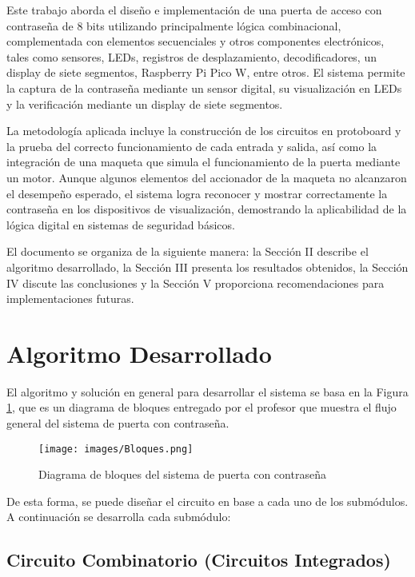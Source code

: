 \documentclass[conference]{IEEEtran}  %
\begin{document}
Este trabajo aborda el diseño e implementación de una puerta de acceso con contraseña de 8 bits utilizando principalmente lógica combinacional, complementada con elementos secuenciales y otros componentes electrónicos, tales como sensores, LEDs, registros de desplazamiento, decodificadores, un display de siete segmentos, Raspberry Pi Pico W, entre otros. El sistema permite la captura de la contraseña mediante un sensor digital, su visualización en LEDs y la verificación mediante un display de siete segmentos.

La metodología aplicada incluye la construcción de los circuitos en protoboard y la prueba del correcto funcionamiento de cada entrada y salida, así como la integración de una maqueta que simula el funcionamiento de la puerta mediante un motor. Aunque algunos elementos del accionador de la maqueta no alcanzaron el desempeño esperado, el sistema logra reconocer y mostrar correctamente la contraseña en los dispositivos de visualización, demostrando la aplicabilidad de la lógica digital en sistemas de seguridad básicos.

El documento se organiza de la siguiente manera: la Sección II describe el algoritmo desarrollado, la Sección III presenta los resultados obtenidos, la Sección IV discute las conclusiones y la Sección V proporciona recomendaciones para implementaciones futuras.

\section{Algoritmo Desarrollado}
El algoritmo y solución en general para desarrollar el sistema se basa en la Figura \ref{fig:bloques}, que es un diagrama de bloques entregado por el profesor que muestra el flujo general del sistema de puerta con contraseña.

\begin{figure}[h]
    \centering
    \texttt{[image: images/Bloques.png]}
    \caption{Diagrama de bloques del sistema de puerta con contraseña}
    \label{fig:bloques}
\end{figure}

De esta forma, se puede diseñar el circuito en base a cada uno de los submódulos. A continuación se desarrolla cada submódulo:

\subsection{Circuito Combinatorio (Circuitos Integrados)}
\end{document}
